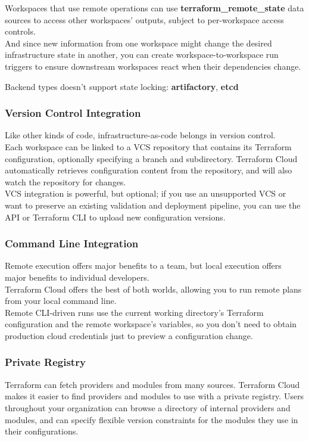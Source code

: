 \documentclass[12pt, letterpaper, twoside]{article}
\begin{document}
Workspaces that use remote operations can use \textbf{terraform\_remote\_state} data sources 
to access other workspaces' outputs, subject to per-workspace access controls.\\
And since new information from one workspace might change the desired infrastructure state in another,
you can create workspace-to-workspace run triggers to ensure downstream workspaces react when their 
dependencies change.

Backend types doesn’t support state locking: \textbf{artifactory}, \textbf{etcd}

\subsubsection{Version Control Integration}
Like other kinds of code, infrastructure-as-code belongs in version control.\\
Each workspace can be linked to a VCS repository that contains its Terraform configuration, 
optionally specifying a branch and subdirectory. Terraform Cloud automatically retrieves configuration
content from the repository, and will also watch the repository for changes.\\

VCS integration is powerful, but optional; if you use an unsupported VCS or want to preserve an 
existing validation and deployment pipeline, you can use the API or Terraform CLI to upload new 
configuration versions.

\subsubsection{Command Line Integration}
Remote execution offers major benefits to a team, but local execution offers major benefits to individual 
developers.\\
Terraform Cloud offers the best of both worlds, allowing you to run remote plans from your local command 
line.\\

Remote CLI-driven runs use the current working directory's Terraform configuration and the remote 
workspace's variables, so you don't need to obtain production cloud credentials just to preview a 
configuration change.

\subsubsection{Private Registry}
Terraform can fetch providers and modules from many sources. Terraform Cloud makes it easier to find 
providers and modules to use with a private registry. Users throughout your organization can browse a 
directory of internal providers and modules, and can specify flexible version constraints for the modules 
they use in their configurations.\\
\end{document}
